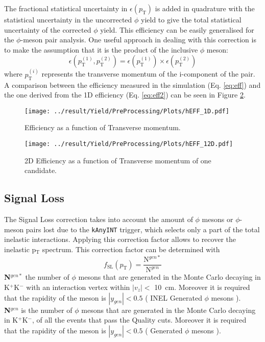 The fractional statistical uncertainty in $\epsilon(p_{\text{T}})$ is added in quadrature with the statistical uncertainty in the uncorrected $\phi$ yield to give the total statistical uncertainty of the corrected $\phi$ yield.
This efficiency can be easily generalised for the $\phi$-meson pair analysis. One useful approach in dealing with this correction is to make the assumption that it is the product of the inclusive $\phi$ meson:
\begin{equation}
\epsilon(p_{\text{T}}^{(1)},p_{\text{T}}^{(2)}) = \epsilon(p_{\text{T}}^{(1)}) \times \epsilon(p_{\text{T}}^{(2)})
\label{eq:eff2}
\end{equation}
where $p_{\text{T}}^{(i)}$ represents the transverse momentum of the i-component of the pair. A comparison between the efficiency measured in the simulation (Eq. \ref{eq:eff}) and the one derived from the 1D efficiency (Eq. \ref{eq:eff2}) can be seen in Figure \ref{fig:eff2d}.

\begin{figure}[!h]
\centering
\texttt{[image: ../result/Yield/PreProcessing/Plots/hEFF\_1D.pdf]}
\caption{Efficiency as a function of Transverse momentum.}
\label{fig:eff1d}
\end{figure}

\begin{figure}[!h]
\centering
\texttt{[image: ../result/Yield/PreProcessing/Plots/hEFF\_12D.pdf]}
\caption{2D Efficiency as a function of Transverse momentum of one candidate.}
\label{fig:eff2d}
\end{figure}

\subsection{Signal Loss}
The Signal Loss correction takes into account the amount of $\phi$ mesons or $\phi$-meson pairs lost due to the \texttt{kAnyINT} trigger, which selects only a part of the total inelastic interactions. Applying this correction factor allows to recover the inelastic p$_{\text{T}}$ spectrum. This correction factor can be determined with
\begin{equation}
f_{\text{SL}}(p_{\text{T}}) = \frac{\text{N}^{gen*}}{\text{N}^{gen}}
\label{eq:SL}
\end{equation}
\textbf{N$^{gen*}$} the number of $\phi$ mesons that are generated in the Monte Carlo decaying in K$^+$K$^-$ with an interaction vertex within $|v_{z}|<$ \SI{10}{\centi\meter}. Moreover it is required that the rapidity of the meson is $|y_{gen}|<0.5$ ( INEL Generated $\phi$ mesons ).\\
\textbf{N$^{gen}$} is the number of $\phi$ mesons that are generated in the Monte Carlo decaying in K$^+$K$^-$, of all the events that pass the Quality cuts. Moreover it is required that the rapidity of the meson is $|y_{gen}|<0.5$ ( Generated $\phi$ mesons ).\\

